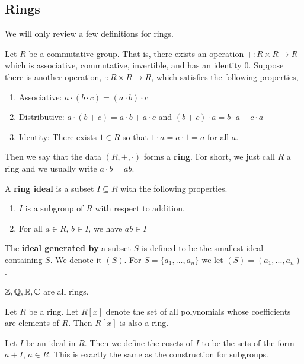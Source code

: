 \subsection{Rings}
We will only review a few definitions for rings.
\begin{defn}[Ring]
Let $R$ be a commutative group. That is, there exists an operation $+ : R \times R \to R$ which is associative, commutative, invertible, and has an identity $0$. Suppose there is another operation, $\cdot : R\times R \to R$, which satisfies the following properties,
\begin{enumerate}
\item {Associative: $a\cdot(b\cdot c) = (a\cdot b)\cdot c$}
\item {Distributive: $a\cdot(b+c)=a\cdot b + a\cdot c$ and $(b+c)\cdot a = b\cdot a + c\cdot a$}
\item {Identity: There exists $1\in R$ so that $1\cdot a = a\cdot 1 = a$ for all $a$.}
\end{enumerate}
Then we say that the data $(R,+,\cdot)$ forms a \textbf{ring}. For short, we just call $R$ a ring and we usually write $a\cdot b = ab$.
\end{defn}
\begin{defn}[Ideal]
    A \textbf{ring ideal} is a subset $I\subseteq R$ with the following properties.
    \begin{enumerate}
    \item {$I$ is a subgroup of $R$ with respect to addition.}
    \item {For all $a \in R$, $b\in I$, we have $ab \in I$}
    \end{enumerate}
\end{defn}
\begin{defn}
    The \textbf{ideal generated by} a subset $S$ is defined to be the smallest ideal containing $S$. We denote it $(S)$. For $S=\{a_1,...,a_n\}$ we let $(S) = (a_1,...,a_n)$.  
\end{defn}
\begin{example}
    $\operatorname{\mathbb{Z}},\operatorname{\mathbb{Q}},\operatorname{\mathbb{R}},\operatorname{\mathbb{C}}$ are all rings.
\end{example}
\begin{example}
    Let $R$ be a ring. Let $R[x]$ denote the set of all polynomials whose coefficients are elements of $R$. Then $R[x]$ is also a ring.
\end{example}
\begin{defn}
    Let $I$ be an ideal in $R$. Then we define the cosets of $I$ to be the sets of the form $a+I$, $a\in R$. This is exactly the same as the construction for subgroups.
\end{defn}
